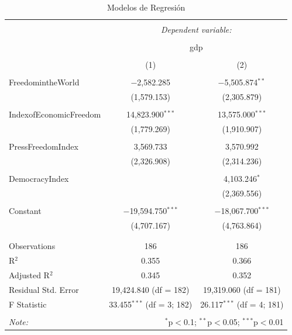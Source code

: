 \documentclass{article}
\begin{document}
\begin{table}[!htbp] \centering 
  \caption{Modelos de Regresión} 
  \label{regresiones} 
\begin{tabular}{@{\extracolsep{5pt}}lcc} 
\\[-1.8ex]\hline 
\hline \\[-1.8ex] 
 & \multicolumn{2}{c}{\textit{Dependent variable:}} \\ 
\cline{2-3} 
\\[-1.8ex] & \multicolumn{2}{c}{gdp} \\ 
\\[-1.8ex] & (1) & (2)\\ 
\hline \\[-1.8ex] 
 FreedomintheWorld & $-$2,582.285 & $-$5,505.874$^{**}$ \\ 
  & (1,579.153) & (2,305.879) \\ 
  & & \\ 
 IndexofEconomicFreedom & 14,823.900$^{***}$ & 13,575.000$^{***}$ \\ 
  & (1,779.269) & (1,910.907) \\ 
  & & \\ 
 PressFreedomIndex & 3,569.733 & 3,570.992 \\ 
  & (2,326.908) & (2,314.236) \\ 
  & & \\ 
 DemocracyIndex &  & 4,103.246$^{*}$ \\ 
  &  & (2,369.556) \\ 
  & & \\ 
 Constant & $-$19,594.750$^{***}$ & $-$18,067.700$^{***}$ \\ 
  & (4,707.167) & (4,763.864) \\ 
  & & \\ 
\hline \\[-1.8ex] 
Observations & 186 & 186 \\ 
R$^{2}$ & 0.355 & 0.366 \\ 
Adjusted R$^{2}$ & 0.345 & 0.352 \\ 
Residual Std. Error & 19,424.840 (df = 182) & 19,319.060 (df = 181) \\ 
F Statistic & 33.455$^{***}$ (df = 3; 182) & 26.117$^{***}$ (df = 4; 181) \\ 
\hline 
\hline \\[-1.8ex] 
\textit{Note:}  & \multicolumn{2}{r}{$^{*}$p$<$0.1; $^{**}$p$<$0.05; $^{***}$p$<$0.01} \\ 
\end{tabular} 
\end{table} 
\clearpage
\end{document}
